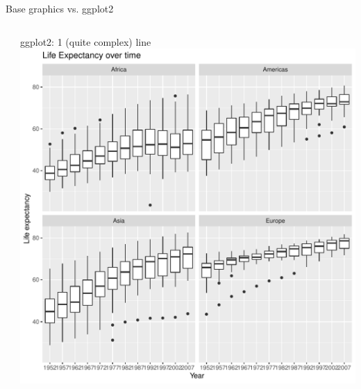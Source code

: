 \documentclass[aspectratio=169]{beamer}\usepackage[]{graphicx}\usepackage[]{color}
\makeatletter
\def\maxwidth{ %
  \ifdim\Gin@nat@width>\linewidth
    \linewidth
  \else
    \Gin@nat@width
  \fi
}
\newenvironment{knitrout}{}{} %
\makeatother
\begin{document}
\begin{frame}[fragile]{Base graphics vs. ggplot2}
\begin{columns}
\begin{column}{0.50\textwidth}
\begin{knitrout}
\end{knitrout}
  \end{column}
  \begin{column}{0.5\textwidth}
  ggplot2: 1 (quite complex) line
\begin{knitrout}\scriptsize
{}\color{fgcolor}
\includegraphics[width=\maxwidth]{figure/unnamed-chunk-2-1} 

\end{knitrout}
  \end{column}
\end{columns}
\end{frame}
\end{document}
